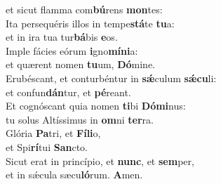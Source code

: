 \oddverse et sicut flamma com\textbf{bú}rens \textbf{mon}tes:\\
\evenverse Ita persequéris illos in tempe\textbf{stá}te \textbf{tu}a:~\*\\
\evenverse et in ira tua tur\textbf{bá}bis \textbf{e}os.\\
\oddverse Imple fácies eórum \textbf{i}gno\textbf{mí}\textbf{ni}a:~\*\\
\oddverse et quærent nomen \textbf{tu}um, \textbf{Dó}mine.\\
\evenverse Erubéscant, et conturbéntur in \textbf{sǽ}culum \textbf{sǽ}\textbf{cu}li:~\*\\
\evenverse et confun\textbf{dán}tur, et \textbf{pé}reant.\\
\oddverse Et cognóscant quia nomen \textbf{ti}bi \textbf{Dó}\textbf{mi}nus:~\*\\
\oddverse tu solus Altíssimus in \textbf{om}ni \textbf{ter}ra.\\
\evenverse Glória \textbf{Pa}tri, et \textbf{Fí}\textbf{li}o,~\*\\
\evenverse et Spi\textbf{rí}tui \textbf{San}cto.\\
\oddverse Sicut erat in princípio, et \textbf{nunc}, et \textbf{sem}per,~\*\\
\oddverse et in sǽcula sæcu\textbf{ló}rum. \textbf{A}men.\\
